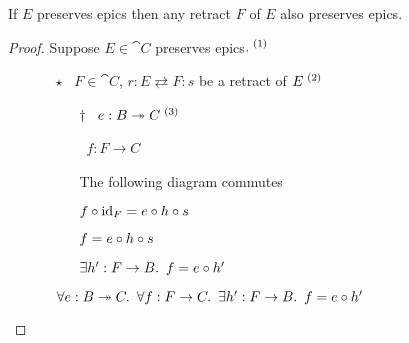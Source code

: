 \begin{prop}
  If $E$ preserves epics then any retract $F$ of $E$ also preserves epics.

  \begin{proof}
    Suppose $E\in\cat{C}$ preserves epics$.^{\text~(1)}$

    \begin{itemize}
      \item[\phs]
        \begin{itemize}
          \item[$\star$]
            \Let~$F \in \cat{C}$, $r : E \rightleftarrows F : s$ be a retract of $E^{\text~(2)}$
            \marginnote{\Hyp}

          \item[\phs]
            \begin{itemize}
              \item[$\dagger$]
                \Let~$e : B \twoheadrightarrow C^{\text~(3)}$
                \marginnote{\Hyp}

              \item[\phs]
                \Let~$f : F \to C$
                \marginnote{\Hyp}

              \item[\imps]
                The following diagram commutes
                \begin{center}
                \end{center}

              \item[\imps] $f\circ\operatorname{id}_F = e\circ h\circ s$

              \item[\imps] $f = e\circ h\circ s$
                \marginnote{\Def-$\id$}

              \item[\imps] $\exists h^\prime : F\to B\ldotp~f = e\circ h^\prime$
                \marginnote{$\exists$-\Intro}
            \end{itemize}
            \item[\imps]
              $\forall e : B \twoheadrightarrow C\ldotp~\forall f : F \to C\ldotp~\exists h^\prime : F\to B\ldotp~f = e\circ h^\prime$
              \marginnote{$\forall$-\Intro-$\dagger$}


\end{itemize}
\end{itemize}
\end{proof}
\end{prop}
